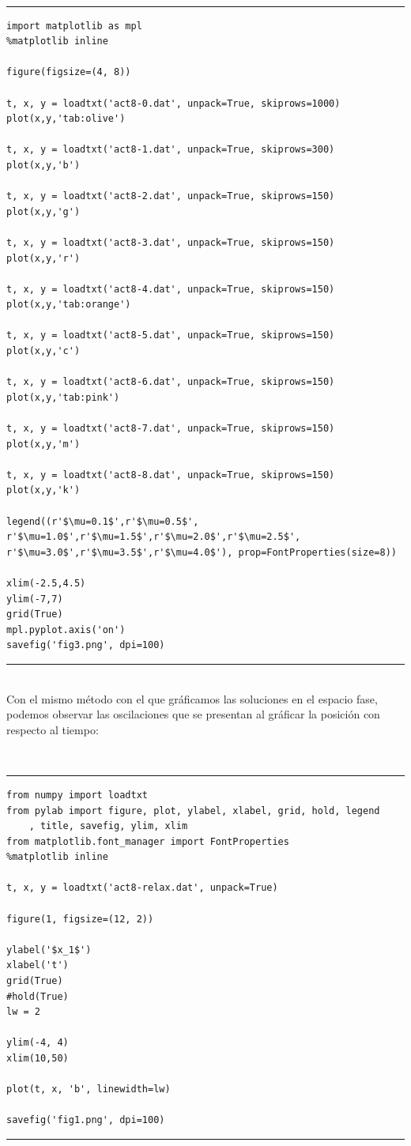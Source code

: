 \documentclass{article}
\begin{document}
~\\
\hrule
\begin{verbatim}
import matplotlib as mpl
%matplotlib inline

figure(figsize=(4, 8))

t, x, y = loadtxt('act8-0.dat', unpack=True, skiprows=1000)
plot(x,y,'tab:olive')

t, x, y = loadtxt('act8-1.dat', unpack=True, skiprows=300)
plot(x,y,'b')

t, x, y = loadtxt('act8-2.dat', unpack=True, skiprows=150)
plot(x,y,'g')

t, x, y = loadtxt('act8-3.dat', unpack=True, skiprows=150)
plot(x,y,'r')

t, x, y = loadtxt('act8-4.dat', unpack=True, skiprows=150)
plot(x,y,'tab:orange')

t, x, y = loadtxt('act8-5.dat', unpack=True, skiprows=150)
plot(x,y,'c')

t, x, y = loadtxt('act8-6.dat', unpack=True, skiprows=150)
plot(x,y,'tab:pink')

t, x, y = loadtxt('act8-7.dat', unpack=True, skiprows=150)
plot(x,y,'m')

t, x, y = loadtxt('act8-8.dat', unpack=True, skiprows=150)
plot(x,y,'k')

legend((r'$\mu=0.1$',r'$\mu=0.5$', r'$\mu=1.0$',r'$\mu=1.5$',r'$\mu=2.0$',r'$\mu=2.5$',
r'$\mu=3.0$',r'$\mu=3.5$',r'$\mu=4.0$'), prop=FontProperties(size=8))

xlim(-2.5,4.5)
ylim(-7,7)
grid(True)
mpl.pyplot.axis('on')
savefig('fig3.png', dpi=100)
\end{verbatim}
\hrule 
~\\

Con el mismo método con el que gráficamos las soluciones en el espacio fase, podemos observar las oscilaciones que se presentan al gráficar la posición con respecto al tiempo:

~\\
\hrule
\begin{verbatim}
from numpy import loadtxt
from pylab import figure, plot, ylabel, xlabel, grid, hold, legend
	, title, savefig, ylim, xlim
from matplotlib.font_manager import FontProperties
%matplotlib inline

t, x, y = loadtxt('act8-relax.dat', unpack=True)

figure(1, figsize=(12, 2))

ylabel('$x_1$')
xlabel('t')
grid(True)
#hold(True)
lw = 2

ylim(-4, 4)
xlim(10,50)

plot(t, x, 'b', linewidth=lw)

savefig('fig1.png', dpi=100)
\end{verbatim}
\hrule
~\\
\end{document}
